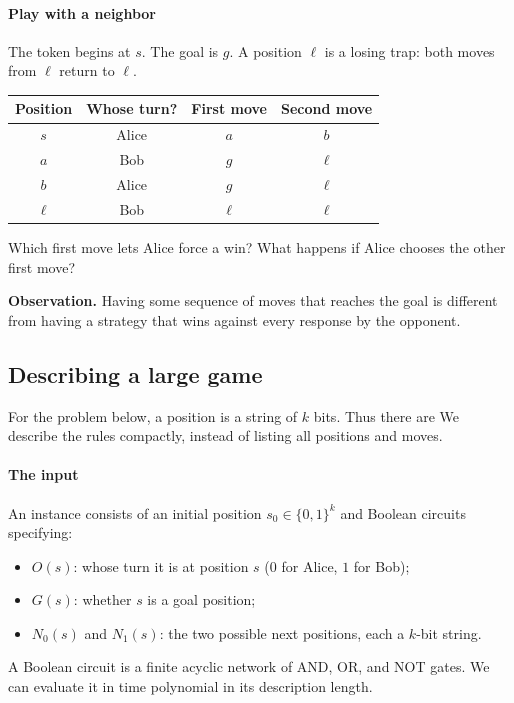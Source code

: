 \documentclass[11  pt]{article}
\begin{document}
\paragraph{Play with a neighbor}
The token begins at $s$. The goal is $g$. A position $\ell$ is a losing trap: both moves from $\ell$ return to $\ell$.
\begin{center}
    \begin{tabular}{c|c|c|c}
        Position & Whose turn? & First move & Second move \\
        \hline
        $s$ & Alice & $a$ & $b$ \\
        $a$ & Bob & $g$ & $\ell$ \\
        $b$ & Alice & $g$ & $\ell$ \\
        $\ell$ & Bob & $\ell$ & $\ell$
    \end{tabular}
\end{center}
Which first move lets Alice force a win? What happens if Alice chooses the other first move?
\vs{1.5cm}

\vfill
\textbf{Observation.} Having some sequence of moves that reaches the goal is different from having a strategy that wins against every response by the opponent.

\newpage
\subsection*{Describing a large game}
For the problem below, a position is a string of $k$ bits. Thus there are  We describe the rules compactly, instead of listing all positions and moves.

\paragraph{The input}
An instance consists of an initial position $s_0\in\{0,1\}^k$ and Boolean circuits specifying:
\begin{itemize}
    \item $O(s)$: whose turn it is at position $s$ ($0$ for Alice, $1$ for Bob);
    \item $G(s)$: whether $s$ is a goal position;
    \item $N_0(s)$ and $N_1(s)$: the two possible next positions, each a $k$-bit string.
\end{itemize}
A Boolean circuit is a finite acyclic network of AND, OR, and NOT gates. We can evaluate it in time polynomial in its description length.
\end{document}
